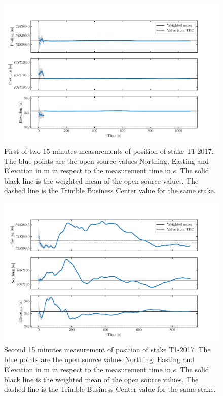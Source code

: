\begin{figure}[H]
    \centering
    \includegraphics[width=\textwidth]{./figs/timeseries/46250700_corr-T1-i-2017_Timeseries-east-north-elev.pdf}
    \caption{First of two 15 minutes measurements of position of stake T1-2017. The blue points are the open source values Northing, Easting and Elevation in m in respect to the measurement time in s. The solid black line is the weighted mean of the open source values. The dashed line is the Trimble Business Center value for the same stake.}
    \label{GPS:fig:T1-i_timeseries}
\end{figure}

\begin{figure}[H]
    \centering
    \includegraphics[width=\textwidth]{./figs/timeseries/46250723_corr-T1-ii-2017_Timeseries-east-north-elev.pdf}
    \caption{Second 15 minutes measurement of position of stake T1-2017. The blue points are the open source values Northing, Easting and Elevation in m in respect to the measurement time in s. The solid black line is the weighted mean of the open source values. The dashed line is the Trimble Business Center value for the same stake.}
    \label{GPS:fig:T1-ii_timeseries}
\end{figure}

